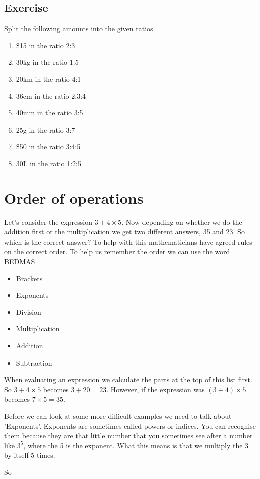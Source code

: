 \subsection{Exercise}
Split the following amounts into the given ratios
\begin{enumerate}
	\item \$15 in the ratio 2:3
	\item 30kg in the ratio 1:5
	\item 20km in the ratio 4:1
	\item 36cm in the ratio 2:3:4
	\item 40mm in the ratio 3:5
	\item 25g in the ratio 3:7
	\item \$50 in the ratio 3:4:5
	\item 30L in the ratio 1:2:5
\end{enumerate}
\section{Order of operations}
Let's consider the expression $3+4 \times 5$.  Now depending on whether we do the addition first or the multiplication we get two different answers, 35 and 23.  So which is the correct answer?  To help with this mathematicians have agreed rules on the correct order.  To help us remember the order we can use the word BEDMAS

\begin{itemize}
	\item Brackets
	\item Exponents
	\item Division
	\item Multiplication
	\item Addition
	\item Subtraction
\end{itemize}

When evaluating an expression we calculate the parts at the top of this list first.  So $3+4 \times 5$ becomes $3 + 20 = 23$.  However, if the expression was $(3+4) \times 5$ becomes $7 \times 5 = 35$.

Before we can look at some more difficult examples we need to talk about 'Exponents'.  Exponents are sometimes called powers or indices.  You can recognise them because they are that little number that you sometimes see after a number like $3^5$, where the 5 is the exponent.  What this means is that we multiply the 3 by itself 5 times.

So

